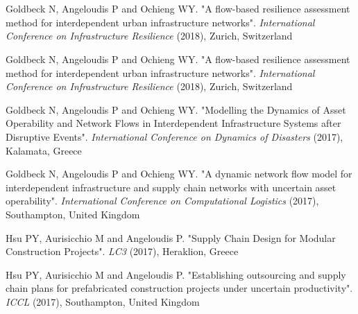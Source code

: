 \documentclass[margin]{res}
\begin{document}
\begin{resume}
\nocite{*}

\section{}
\printbibliography[heading=none,type=article,resetnumbers=true]

\section{}
\printbibliography[heading=none,type=incollection,resetnumbers=true]

\section{}
\begin{etaremune}
\renewcommand\labelenumi{C\theenumi. }
	\item
	{Goldbeck N, Angeloudis P and Ochieng WY}. "{A flow-based resilience assessment method for interdependent urban infrastructure networks}". \textit{International Conference on Infrastructure Resilience} (2018), Zurich, Switzerland
	\item
	{Goldbeck N, Angeloudis P and Ochieng WY}. "{A flow-based resilience assessment method for interdependent urban infrastructure networks}". \textit{International Conference on Infrastructure Resilience} (2018), Zurich, Switzerland
	\item
	{Goldbeck N, Angeloudis P and Ochieng WY}. "{Modelling the Dynamics of Asset Operability and Network Flows in Interdependent Infrastructure Systems after Disruptive Events}". \textit{International Conference on Dynamics of Disasters} (2017), Kalamata, Greece
	\item
	{Goldbeck N, Angeloudis P and Ochieng WY}. "{A dynamic network flow model for interdependent infrastructure and supply chain networks with uncertain asset operability}". \textit{International Conference on Computational Logistics} (2017), Southampton, United Kingdom
	\item
	{Hsu PY, Aurisicchio M and Angeloudis P}. "{Supply Chain Design for Modular Construction Projects}". \textit{LC3} (2017), Heraklion, Greece
	\item
	{Hsu PY, Aurisicchio M and Angeloudis P}. "{Establishing outsourcing and supply chain plans for prefabricated construction projects under uncertain productivity}". \textit{ICCL} (2017), Southampton, United Kingdom

\end{etaremune}
\end{resume}
\end{document}
